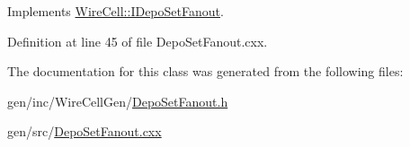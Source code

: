 Implements \hyperlink{class_wire_cell_1_1_i_depo_set_fanout_a90833e933801d4152272189dc6ba1e38}{Wire\+Cell\+::\+I\+Depo\+Set\+Fanout}.



Definition at line 45 of file Depo\+Set\+Fanout.\+cxx.



The documentation for this class was generated from the following files\+:\begin{DoxyCompactItemize}
\item 
gen/inc/\+Wire\+Cell\+Gen/\hyperlink{_depo_set_fanout_8h}{Depo\+Set\+Fanout.\+h}\item 
gen/src/\hyperlink{_depo_set_fanout_8cxx}{Depo\+Set\+Fanout.\+cxx}\end{DoxyCompactItemize}
